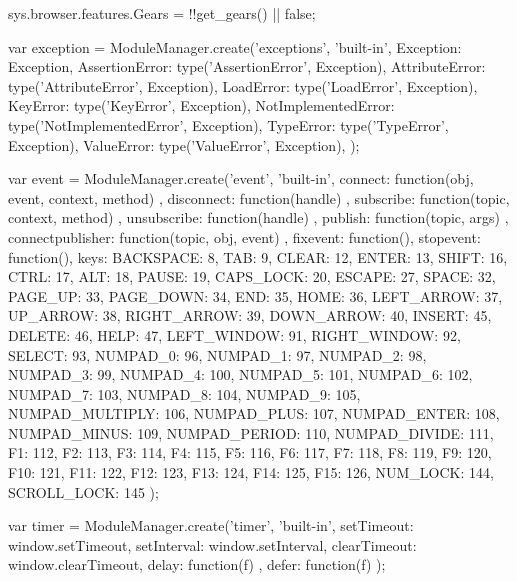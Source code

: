     sys.browser.features.Gears = !!get_gears() || false;

var exception = ModuleManager.create('exceptions', 'built-in', {
        Exception: Exception,
        AssertionError: type('AssertionError', Exception),
        AttributeError: type('AttributeError', Exception),
        LoadError: type('LoadError', Exception),
        KeyError: type('KeyError', Exception),
        NotImplementedError: type('NotImplementedError', Exception),
        TypeError: type('TypeError', Exception),
        ValueError: type('ValueError', Exception),
    });


var event = ModuleManager.create('event', 'built-in', {
        connect: function(obj, event, context, method) {
	},
        disconnect: function(handle) {
	},
        subscribe: function(topic, context, method) {
	},
        unsubscribe: function(handle) {
	},
        publish: function(topic, args) {
	},
        connectpublisher: function(topic, obj, event) {
	},
        fixevent: function(){},
        stopevent: function(){},
	keys: { BACKSPACE: 8, TAB: 9, CLEAR: 12, ENTER: 13, SHIFT: 16, CTRL: 17, ALT: 18, PAUSE: 19, CAPS_LOCK: 20, 
		    ESCAPE: 27, SPACE: 32, PAGE_UP: 33, PAGE_DOWN: 34, END: 35, HOME: 36, LEFT_ARROW: 37, UP_ARROW: 38,
		    RIGHT_ARROW: 39, DOWN_ARROW: 40, INSERT: 45, DELETE: 46, HELP: 47, LEFT_WINDOW: 91, RIGHT_WINDOW: 92,
		    SELECT: 93, NUMPAD_0: 96, NUMPAD_1: 97, NUMPAD_2: 98, NUMPAD_3: 99, NUMPAD_4: 100, NUMPAD_5: 101,
		    NUMPAD_6: 102, NUMPAD_7: 103, NUMPAD_8: 104, NUMPAD_9: 105, NUMPAD_MULTIPLY: 106, NUMPAD_PLUS: 107,
		    NUMPAD_ENTER: 108, NUMPAD_MINUS: 109, NUMPAD_PERIOD: 110, NUMPAD_DIVIDE: 111, F1: 112, F2: 113, F3: 114,
		    F4: 115, F5: 116, F6: 117, F7: 118, F8: 119, F9: 120, F10: 121, F11: 122, F12: 123, F13: 124, 
		    F14: 125, F15: 126, NUM_LOCK: 144, SCROLL_LOCK: 145 }
    });

var timer = ModuleManager.create('timer', 'built-in', {
	setTimeout: window.setTimeout,
	setInterval: window.setInterval,
	clearTimeout: window.clearTimeout,
	delay: function(f) {
	},
	defer: function(f) {
	}
    });

